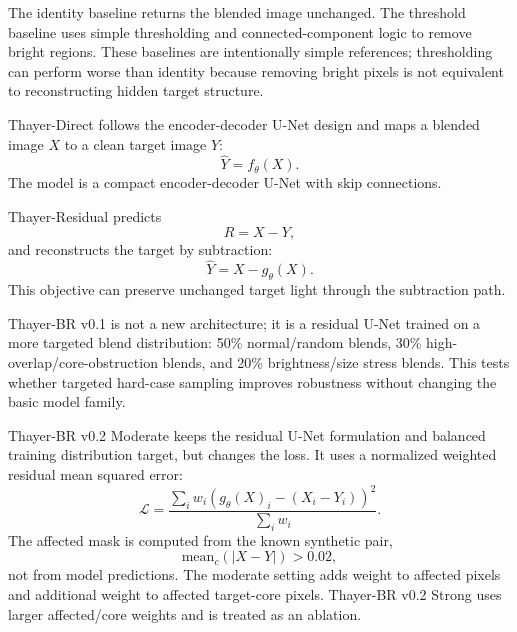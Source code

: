 The identity baseline returns the blended image unchanged. The threshold
baseline uses simple thresholding and connected-component logic to remove bright
regions. These baselines are intentionally simple references; thresholding can
perform worse than identity because removing bright pixels is not equivalent to
reconstructing hidden target structure.

Thayer-Direct follows the encoder-decoder U-Net design
\cite{ronneberger2015unet} and maps a blended image $X$ to a clean target image
$Y$:
\[
    \hat{Y} = f_{\theta}(X).
\]
The model is a compact encoder-decoder U-Net with skip connections.

Thayer-Residual predicts
\[
    R = X - Y,
\]
and reconstructs the target by subtraction:
\[
    \hat{Y} = X - g_{\theta}(X).
\]
This objective can preserve unchanged target light through the subtraction path.

Thayer-BR v0.1 is not a new architecture; it is a residual U-Net trained on a
more targeted blend distribution: 50\% normal/random blends, 30\%
high-overlap/core-obstruction blends, and 20\% brightness/size stress blends.
This tests whether targeted hard-case sampling improves robustness without
changing the basic model family.

Thayer-BR v0.2 Moderate keeps the residual U-Net formulation and balanced
training distribution target, but changes the loss. It uses a normalized
weighted residual mean squared error:
\[
    \mathcal{L} =
    \frac{\sum_i w_i \left(g_{\theta}(X)_i - (X_i - Y_i)\right)^2}
         {\sum_i w_i}.
\]
The affected mask is computed from the known synthetic pair,
\[
    \mathrm{mean}_c(|X - Y|) > 0.02,
\]
not from model predictions. The moderate setting adds weight to affected pixels
and additional weight to affected target-core pixels. Thayer-BR v0.2 Strong
uses larger affected/core weights and is treated as an ablation.
